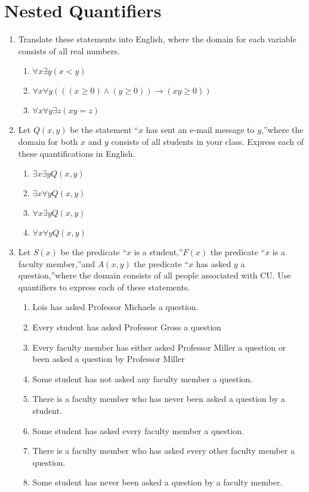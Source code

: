 \documentclass{../../cls/sig-alternate-05-2015}
\begin{document}
\section{Nested Quantifiers}

\begin{enumerate}
\item Translate these statements into English, where the domain
for each variable consists of all real numbers.
\begin{enumerate}
	\item $\forall x \exists y (x < y)$
	\item $\forall x \forall y (((x \ge 0) \wedge (y \ge 0)) \rightarrow (x y \ge 0))$
	\item $\forall x \forall y \exists z (x y = z)$
\end{enumerate}

\item Let $Q(x, y)$ be the statement \textquotedblleft $x$ has sent an e-mail message
to $y$,\textquotedblright where the domain for both $x$ and $y$ consists of
all students in your class. Express each of these quantifications in English.
\begin{enumerate}
	\item $\exists x \exists y Q(x, y)$
	\item $\exists x \forall y Q(x, y)$
	\item $\forall x \exists y Q(x, y)$
	\item $\forall x \forall y Q(x, y)$
\end{enumerate}

\item Let $S(x)$ be the predicate \textquotedblleft $x$ is a student,\textquotedblright $F(x)$ the predicate
\textquotedblleft $x$ is a faculty member,\textquotedblright and $A(x, y)$ the predicate
\textquotedblleft $x$ has asked $y$ a question,\textquotedblright where the domain consists of
all people associated with CU. Use quantifiers to
express each of these statements.
\begin{enumerate}
	\item Lois has asked Professor Michaels a question.
	\item Every student has asked Professor Gross a question
	\item Every faculty member has either asked Professor
	Miller a question or been asked a question by Professor
	Miller
	\item Some student has not asked any faculty member a
	question.
	\item There is a faculty member who has never been asked
	a question by a student.
	\item Some student has asked every faculty member a question.
	\item There is a faculty member who has asked every other
	faculty member a question.
	\item Some student has never been asked a question by a
	faculty member.
\end{enumerate}
	

\end{enumerate}
\end{document}
